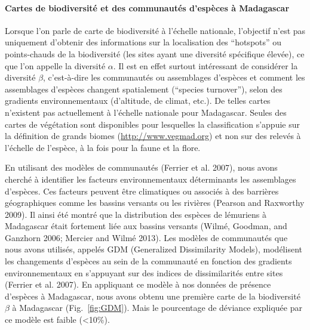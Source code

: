 \documentclass[12pt,]{article}
\let\oldparagraph\paragraph
\renewcommand{\paragraph}[1]{\oldparagraph{#1}\mbox{}}
\begin{document}
\hypertarget{cartes-de-biodiversite-et-des-communautes-despeces-a-madagascar-1}{%
\paragraph{Cartes de biodiversité et des communautés d'espèces à
Madagascar}\label{cartes-de-biodiversite-et-des-communautes-despeces-a-madagascar-1}}

Lorsque l'on parle de carte de biodiversité à l'échelle nationale,
l'objectif n'est pas uniquement d'obtenir des informations sur la
localisation des ``hotspots'' ou points-chauds de la biodiversité (les
sites ayant une diversité spécifique élevée), ce que l'on appelle la
diversité \(\alpha\). Il est en effet surtout intéressant de considérer
la diversité \(\beta\), c'est-à-dire les communautés ou assemblages
d'espèces et comment les assemblages d'espèces changent spatialement
(``species turnover''), selon des gradients environnementaux
(d'altitude, de climat, etc.). De telles cartes n'existent pas
actuellement à l'échelle nationale pour Madagascar. Seules des cartes de
végétation sont disponibles pour lesquelles la classification s'appuie
sur la définition de grands biomes (\url{http://www.vegmad.org}) et non
sur des relevés à l'échelle de l'espèce, à la fois pour la faune et la
flore.

En utilisant des modèles de communautés (Ferrier et al. 2007), nous
avons cherché à identifier les facteurs environnementaux déterminants
les assemblages d'espèces. Ces facteurs peuvent être climatiques ou
associés à des barrières géographiques comme les bassins versants ou les
rivières (Pearson and Raxworthy 2009). Il ainsi été montré que la
distribution des espèces de lémuriens à Madagascar était fortement liée
aux bassins versants (Wilmé, Goodman, and Ganzhorn 2006; Mercier and
Wilmé 2013). Les modèles de communautés que nous avons utilisés, appelés
GDM (Generalized Dissimilarity Models), modélisent les changements
d'espèces au sein de la communauté en fonction des gradients
environnementaux en s'appuyant sur des indices de dissimilarités entre
sites (Ferrier et al. 2007). En appliquant ce modèle à nos données de
présence d'espèces à Madagascar, nous avons obtenu une première carte de
la biodiversité \(\beta\) à Madagascar (Fig.~\ref{fig:GDM}). Mais le
pourcentage de déviance expliquée par ce modèle est faible
(\textless{}10\%).
\end{document}
